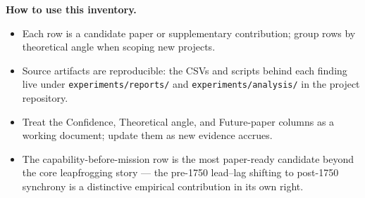 \documentclass[11pt]{article}
\begin{document}
\noindent\textbf{How to use this inventory.}
\begin{itemize}
\item Each row is a candidate paper or supplementary contribution; group rows by theoretical angle
      when scoping new projects.
\item Source artifacts are reproducible: the CSVs and scripts behind each finding live under
      \texttt{experiments/reports/} and \texttt{experiments/analysis/} in the project repository.
\item Treat the Confidence, Theoretical angle, and Future-paper columns as a working document;
      update them as new evidence accrues.
\item The capability-before-mission row is the most paper-ready candidate beyond the core
      leapfrogging story --- the pre-1750 lead--lag shifting to post-1750 synchrony is a
      distinctive empirical contribution in its own right.
\end{itemize}
\end{document}
